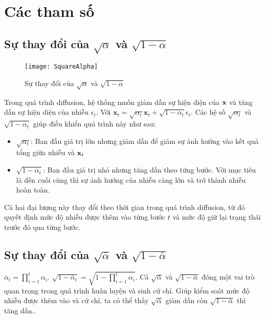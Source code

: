 \appendix
\renewcommand{\chaptername}{Phụ lục}
\chapter{Các tham số}
 \label{Appendix1}

\section{Sự thay đổi của $\sqrt{\alpha}$ và $\sqrt{1 - \alpha}$}

\setcounter{figure}{13}
\begin{figure}
	\texttt{[image: SquareAlpha]}
	\label{fig:wrapfig}
	\caption{Sự thay đổi của $\sqrt{\alpha}$ và $\sqrt{1 - \alpha}$}
\end{figure}

Trong quá trình diffusion, hệ thống muốn giảm dần sự hiện diện của $\mathbf{x}$ và tăng dần sự hiện diện của nhiễu $\epsilon_t$. Với $\mathbf{x}_t = \sqrt{\alpha_t} \mathbf{x}_t + \sqrt{1 - \alpha_t} \epsilon_t$. Các hệ số $\sqrt{\alpha_t}$ và $\sqrt{1 - \alpha_t}$ giúp điều khiển quá trình này như sau:



\begin{itemize}
	\item $\sqrt{\alpha_t}$: Ban đầu giá trị lớn nhưng giảm dần để giảm sự ảnh hưởng vào kết quả tổng giữa nhiễu và $\mathbf{x}_t$
	\item $\sqrt{1 - \alpha_t}$: Ban đầu giá trị nhỏ nhưng tăng dần theo từng bước. Với mục tiêu là đến cuối cùng thì sự ảnh hưởng của nhiễu càng lớn và trở thành nhiễu hoàn toàn.
\end{itemize}


Cả hai đại lượng này thay đổi theo thời gian trong quá trình diffusion, từ đó quyết định mức độ nhiễu được thêm vào từng bước $t$ và mức độ giữ lại trạng thái trước đó qua từng bước.


\section{Sự thay đổi của $\sqrt{\bar{\alpha}}$ và $\sqrt{1 - \bar{\alpha}}$}

$\bar{\alpha}_t = \prod_{i=1}^t \alpha_i$.  $\sqrt{1 - \bar{\alpha}_t} = \sqrt{1 - \prod_{i=1}^t \alpha_i}$. Cả $\sqrt{\bar{\alpha}}$ và $\sqrt{1 - \bar{\alpha}}$ đóng một vai trò quan trọng trong quá trình huấn luyện và sinh cử chỉ. Giúp kiểm soát mức độ nhiễu được thêm vào và cử chỉ, ta có thể thấy $\sqrt{\bar{\alpha}}$ giảm dần còn $\sqrt{1 - \bar{\alpha}}$ thì tăng dần..


